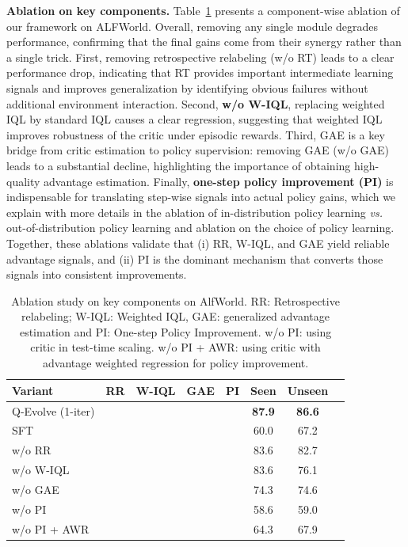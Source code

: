 \documentclass{article}
\newcommand{\cmark}{\textcolor{green!60!black}{\ding{51}}} %
\newcommand{\xmark}{\textcolor{red!70!black}{\ding{55}}}   %
\theoremstyle{plain}
\theoremstyle{definition}
\theoremstyle{remark}
\begin{document}
\textbf{Ablation on key components.}
Table~\ref{tab:ablation} presents a component-wise ablation of our framework on ALFWorld. Overall, removing any single module degrades performance, confirming that the final gains come from their synergy rather than a single trick. First, removing retrospective relabeling (w/o RT) leads to a clear performance drop, indicating that RT provides important intermediate learning signals and improves generalization by identifying obvious failures without additional environment interaction.
 Second, \textbf{w/o W-IQL}, replacing weighted IQL by standard IQL causes a clear regression, suggesting that weighted IQL improves robustness of the critic under episodic rewards. Third, GAE is a key bridge from critic estimation to policy supervision: removing GAE (w/o GAE) leads to a substantial decline, highlighting the importance of obtaining high-quality advantage estimation. Finally, \textbf{one-step policy improvement (PI)} is indispensable for translating step-wise signals into actual policy gains, which we explain with more details in the ablation of in-distribution policy learning \emph{vs.} out-of-distribution policy learning and ablation on the choice of policy learning. Together, these ablations validate that (i) RR, W-IQL, and GAE yield reliable advantage signals, and (ii) PI is the dominant mechanism that converts those signals into consistent improvements.

\begin{table}[t]
\centering
\setlength{\tabcolsep}{3.5pt}      %
\small
\caption{Ablation study on key components on AlfWorld. RR: Retrospective relabeling; W-IQL: Weighted IQL, GAE: generalized advantage estimation and PI: One-step Policy Improvement. w/o PI: using critic in test-time scaling. w/o PI + AWR: using critic with advantage weighted regression for policy improvement.}
\begin{tabular}{lccccccc}
\toprule
Variant & RR & {W-IQL} & {GAE} & {PI}  & {Seen}  & {Unseen} \\
\midrule
Q-Evolve (1-iter)  & \cmark & \cmark &\cmark & \cmark  & \textbf{87.9}  & \textbf{86.6}  \\
SFT  & \xmark & \xmark &\xmark & \xmark  &  60.0  &  67.2\\
\midrule
 w/o RR  & \xmark & \cmark & \cmark & \cmark &  83.6 & 82.7  \\
 w/o W-IQL  & \cmark & \xmark & \cmark & \cmark & 83.6  & 76.1  \\
 w/o GAE & \cmark & \cmark & \xmark & \cmark & 74.3  & 74.6  \\
 w/o PI & \cmark & \cmark  & \cmark & \xmark & 58.6 & 59.0  \\
  w/o PI + AWR & \cmark & \cmark  & \cmark & \cmark & 64.3  & 67.9  \\
\bottomrule
\end{tabular}
\label{tab:ablation}
\end{table}
\end{document}
